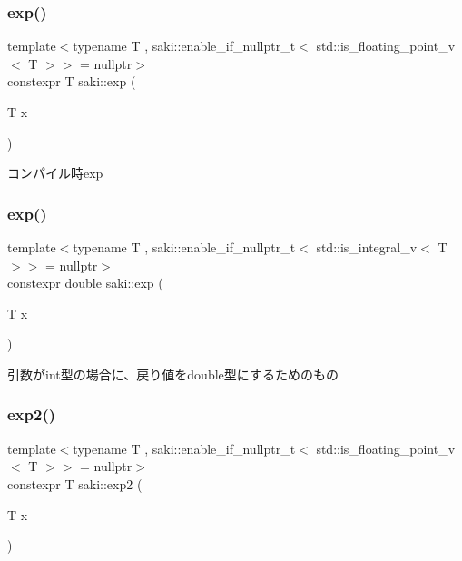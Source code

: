 \subsubsection{\texorpdfstring{exp()}{exp()}\hspace{0.1cm}{\footnotesize\ttfamily [1/2]}}
{\footnotesize\ttfamily template$<$typename T , saki\+::enable\+\_\+if\+\_\+nullptr\+\_\+t$<$ std\+::is\+\_\+floating\+\_\+point\+\_\+v$<$ T $>$$>$  = nullptr$>$ \\
constexpr T saki\+::exp (\begin{DoxyParamCaption}\item[{T}]{x }\end{DoxyParamCaption})}



コンパイル時exp 

\mbox{\label{namespacesaki_ab7883c6dfd2cf3ae04993f64d98345fc}} 
\subsubsection{\texorpdfstring{exp()}{exp()}\hspace{0.1cm}{\footnotesize\ttfamily [2/2]}}
{\footnotesize\ttfamily template$<$typename T , saki\+::enable\+\_\+if\+\_\+nullptr\+\_\+t$<$ std\+::is\+\_\+integral\+\_\+v$<$ T $>$$>$  = nullptr$>$ \\
constexpr double saki\+::exp (\begin{DoxyParamCaption}\item[{T}]{x }\end{DoxyParamCaption})}



引数がint型の場合に、戻り値をdouble型にするためのもの 

\mbox{\label{namespacesaki_a2e2d4ba08357bbab05c97ae261c80343}} 
\subsubsection{\texorpdfstring{exp2()}{exp2()}\hspace{0.1cm}{\footnotesize\ttfamily [1/2]}}
{\footnotesize\ttfamily template$<$typename T , saki\+::enable\+\_\+if\+\_\+nullptr\+\_\+t$<$ std\+::is\+\_\+floating\+\_\+point\+\_\+v$<$ T $>$$>$  = nullptr$>$ \\
constexpr T saki\+::exp2 (\begin{DoxyParamCaption}\item[{T}]{x }\end{DoxyParamCaption})}



